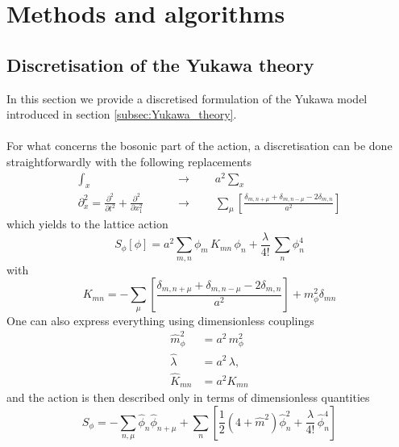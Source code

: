 \chapter{Methods and algorithms}

\section{Discretisation of the Yukawa theory}
\label{sec:lattice_discretisation}

In this section we provide a discretised formulation of the Yukawa model introduced in section \ref{subsec:Yukawa_theory}. \\~\\
For what concerns the bosonic part of the action, a discretisation can be done straightforwardly with the following replacements
\begin{equation*}
    \begin{aligned}
        \int_x \qquad &\to \qquad a^2 \sum_x \\
        \partial^2_x = \frac{\partial^2}{\partial t^2} + \frac{\partial^2}{\partial x_1^2} \qquad &\to \qquad \sum_\mu \left[\frac{\delta_{m,n+\mu} + \delta_{m,n-\mu} - 2 \delta_{m,n}}{a^2}\right]
    \end{aligned}
\end{equation*}
which yields to the lattice action
\begin{equation*}
        S_\phi [\phi] =  a^2 \sum_{m,n} \phi_m \, K_{mn} \, \phi_n + \frac{\lambda}{4!} \, \sum_n \phi_n^4 
\end{equation*}
with 
\begin{equation*}
    K_{mn} = - \sum_\mu \left[\frac{\delta_{m,n+\mu} + \delta_{m,n-\mu} - 2 \delta_{m,n}}{a^2}\right] + m_\phi^2 \delta_{mn} 
\end{equation*}
One can also express everything using dimensionless couplings
\begin{equation}
    \begin{aligned}
        \hat m_\phi^2 &= a^2 \, m_\phi^2 \\
        \hat \lambda &= a^{2} \, \lambda, \\
        \hat K_{mn} &= a^2 K_{mn}
    \end{aligned}
    \label{eq:couplings_redefitinion}
\end{equation}
and the action is then described only in terms of dimensionless quantities
\begin{equation*}
    S_\phi=-\sum_{n, \mu} \hat\phi_n \hat\phi_{n+\mu}+\sum_n\left[\frac{1}{2}\left(4+\hat m^2\right) \hat\phi_n^2 +\frac{\hat\lambda}{4 !} \, \hat\phi_n^4\right]
\end{equation*}
